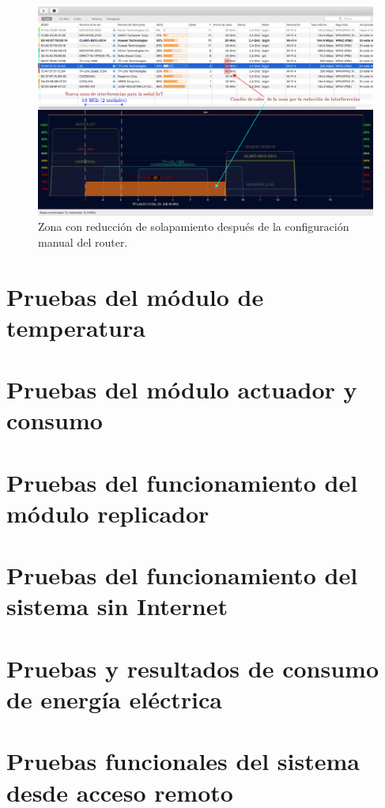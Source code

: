 
\begin{landscape} %
\begin{figure}[htpb]
\centering 
\includegraphics[width=1.5\textwidth]{./Figures/wifi/06.png}
\caption{Zona con reducción de solapamiento después de la configuración manual del router.}
\label{fig:test06}
\end{figure}
\end{landscape} %


\section{Pruebas del módulo de temperatura}
\section{Pruebas del módulo actuador y consumo}
\section{Pruebas del funcionamiento del módulo replicador}
\section{Pruebas del funcionamiento del sistema sin Internet}
\section{Pruebas y resultados de consumo de energía eléctrica}
\section{Pruebas funcionales del sistema desde acceso remoto}
